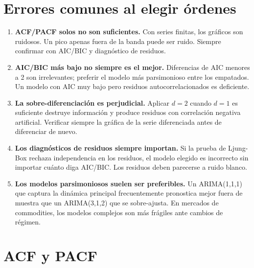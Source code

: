 \documentclass[12pt,a4paper]{article}
\theoremstyle{definition}
\begin{document}
\section{Errores comunes al elegir órdenes}

\begin{warnbox}
\begin{enumerate}
  \item \textbf{ACF/PACF solos no son suficientes.} Con series finitas, los
        gráficos son ruidosos. Un pico apenas fuera de la banda puede ser
        ruido. Siempre confirmar con AIC/BIC y diagnóstico de residuos.

  \item \textbf{AIC/BIC más bajo no siempre es el mejor.}
        Diferencias de AIC menores a 2 son irrelevantes; preferir el modelo
        más parsimonioso entre los empatados. Un modelo con AIC muy bajo pero
        residuos autocorrelacionados es deficiente.

  \item \textbf{La sobre-diferenciación es perjudicial.}
        Aplicar $d=2$ cuando $d=1$ es suficiente destruye información y produce
        residuos con correlación negativa artificial. Verificar siempre la
        gráfica de la serie diferenciada antes de diferenciar de nuevo.

  \item \textbf{Los diagnósticos de residuos siempre importan.}
        Si la prueba de Ljung-Box rechaza independencia en los residuos, el
        modelo elegido es incorrecto sin importar cuánto diga AIC/BIC. Los
        residuos deben parecerse a ruido blanco.

  \item \textbf{Los modelos parsimoniosos suelen ser preferibles.}
        Un ARIMA(1,1,1) que captura la dinámica principal frecuentemente
        pronostica mejor fuera de muestra que un ARIMA(3,1,2) que se sobre-ajusta.
        En mercados de commodities, los modelos complejos son más frágiles ante
        cambios de régimen.
\end{enumerate}
\end{warnbox}

\section{ACF y PACF}
\end{document}
